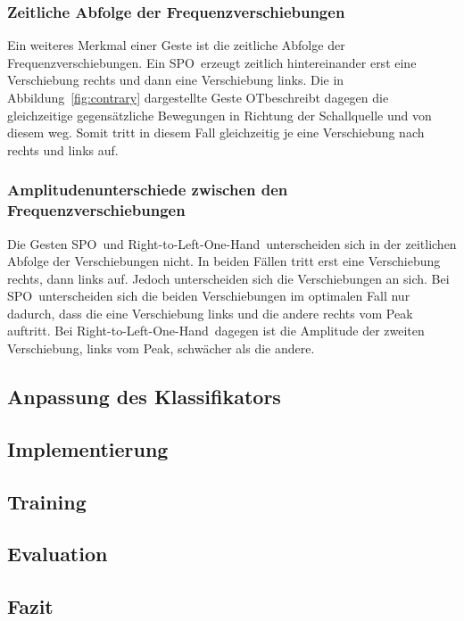 \subsubsection*{Zeitliche Abfolge der Frequenzverschiebungen}
Ein weiteres Merkmal einer Geste ist die zeitliche Abfolge der Frequenzverschiebungen. Ein \glqq \acl{SPO}\grqq\ erzeugt zeitlich hintereinander erst eine Verschiebung rechts und dann eine Verschiebung links. Die in Abbildung~\ref{fig:contrary} dargestellte Geste \glqq \acl{OT}\grqq beschreibt dagegen die gleichzeitige gegensätzliche Bewegungen in Richtung der Schallquelle und von diesem weg. Somit tritt in diesem Fall gleichzeitig je eine Verschiebung nach rechts und links auf. 


\subsubsection*{Amplitudenunterschiede zwischen den Frequenzverschiebungen}
Die Gesten \glqq \acl{SPO}\grqq\ und \glqq Right-to-Left-One-Hand\grqq\ unterscheiden sich in der zeitlichen Abfolge der Verschiebungen nicht. In beiden Fällen tritt erst eine Verschiebung rechts, dann links auf. Jedoch unterscheiden sich die Verschiebungen an sich. Bei \glqq \acl{SPO}\grqq\ unterscheiden sich die beiden Verschiebungen im optimalen Fall nur dadurch, dass die eine Verschiebung links und die andere rechts vom Peak auftritt. Bei \glqq Right-to-Left-One-Hand\grqq\ dagegen ist die Amplitude der zweiten Verschiebung, links vom Peak, schwächer als die andere.

\subsection{Anpassung des Klassifikators}

\subsection{Implementierung}


\subsection{Training}

\subsection{Evaluation}

\subsection{Fazit}



